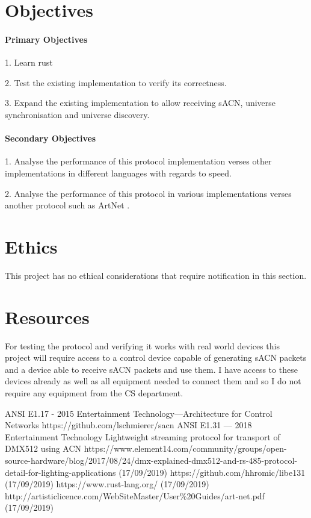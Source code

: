 \documentclass[12pt,a4paper,notitlepage]{report}
\begin{document}
\section*{Objectives}
\paragraph*{Primary Objectives}
\begin{list}{}{}
	\item 1. Learn rust
	\item 2. Test the existing implementation to verify its correctness.
	\item 3. Expand the existing implementation to allow receiving sACN, universe synchronisation and universe discovery.
\end{list}

\paragraph*{Secondary Objectives}
\begin{list}{}{}
	\item 1. Analyse the performance of this protocol implementation verses other implementations in different languages with regards to speed.
	\item 2. Analyse the performance of this protocol in various implementations verses another protocol such as ArtNet \cite{ArtNet}.
\end{list}

\section*{Ethics}
This project has no ethical considerations that require notification in this section.

\section*{Resources}
For testing the protocol and verifying it works with real world devices this project will require access to a control device capable of generating sACN packets and a device able to receive sACN packets and use them. I have access to these devices already as well as all equipment needed to connect them and so I do not require any equipment from the CS department. 
	
\begin{thebibliography}{9}
	ANSI E1.17 - 2015 Entertainment Technology—Architecture for Control Networks
	https://github.com/lschmierer/sacn
	ANSI E1.31 — 2018 Entertainment Technology Lightweight streaming protocol for transport of DMX512 using ACN
	https://www.element14.com/community/groups/open-source-hardware/blog/2017/08/24/dmx-explained-dmx512-and-rs-485-protocol-detail-for-lighting-applications (17/09/2019)
	https://github.com/hhromic/libe131 (17/09/2019)
	https://www.rust-lang.org/ (17/09/2019)
	http://artisticlicence.com/WebSiteMaster/User\%20Guides/art-net.pdf (17/09/2019)
	
	
\end{thebibliography}
\end{document}
